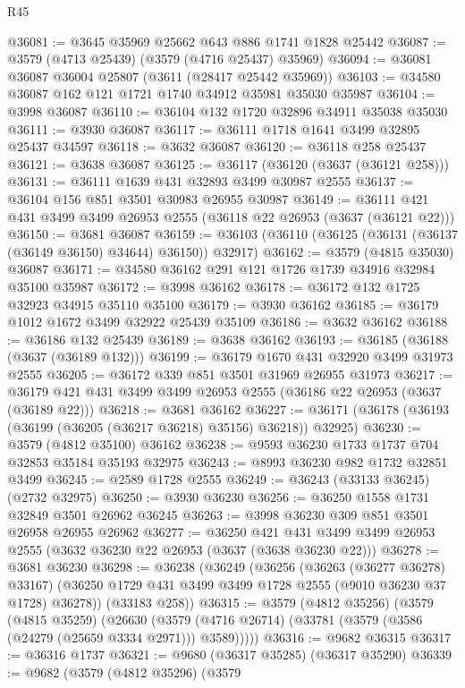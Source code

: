 \begin{lexlean}{R45}
\begin{coremodule}
@36081 := @3645 @35969 @25662 @643 @886 @1741 @1828 @25442
@36087 := @3579 (@4713 @25439) (@3579 (@4716 @25437) @35969)
@36094 := @36081 @36087 @36004 @25807 (@3611 (@28417 @25442 @35969))
@36103 := @34580 @36087 @162 @121 @1721 @1740 @34912 @35981 @35030 @35987
@36104 := @3998 @36087
@36110 := @36104 @132 @1720 @32896 @34911 @35038 @35030
@36111 := @3930 @36087
@36117 := @36111 @1718 @1641 @3499 @32895 @25437 @34597
@36118 := @3632 @36087
@36120 := @36118 @258 @25437
@36121 := @3638 @36087
@36125 := @36117 (@36120 (@3637 (@36121 @258)))
@36131 := @36111 @1639 @431 @32893 @3499 @30987 @2555
@36137 := @36104 @156 @851 @3501 @30983 @26955 @30987
@36149 := @36111 @421 @431 @3499 @3499 @26953 @2555 (@36118 @22 @26953 (@3637 (@36121 @22)))
@36150 := @3681 @36087
@36159 := @36103 (@36110 (@36125 (@36131 (@36137 (@36149 @36150) @34644) @36150)) @32917)
@36162 := @3579 (@4815 @35030) @36087
@36171 := @34580 @36162 @291 @121 @1726 @1739 @34916 @32984 @35100 @35987
@36172 := @3998 @36162
@36178 := @36172 @132 @1725 @32923 @34915 @35110 @35100
@36179 := @3930 @36162
@36185 := @36179 @1012 @1672 @3499 @32922 @25439 @35109
@36186 := @3632 @36162
@36188 := @36186 @132 @25439
@36189 := @3638 @36162
@36193 := @36185 (@36188 (@3637 (@36189 @132)))
@36199 := @36179 @1670 @431 @32920 @3499 @31973 @2555
@36205 := @36172 @339 @851 @3501 @31969 @26955 @31973
@36217 := @36179 @421 @431 @3499 @3499 @26953 @2555 (@36186 @22 @26953 (@3637 (@36189 @22)))
@36218 := @3681 @36162
@36227 := @36171 (@36178 (@36193 (@36199 (@36205 (@36217 @36218) @35156) @36218)) @32925)
@36230 := @3579 (@4812 @35100) @36162
@36238 := @9593 @36230 @1733 @1737 @704 @32853 @35184 @35193 @32975
@36243 := @8993 @36230 @982 @1732 @32851 @3499
@36245 := @2589 @1728 @2555
@36249 := @36243 (@33133 @36245) (@2732 @32975)
@36250 := @3930 @36230
@36256 := @36250 @1558 @1731 @32849 @3501 @26962 @36245
@36263 := @3998 @36230 @309 @851 @3501 @26958 @26955 @26962
@36277 := @36250
    @421
    @431
    @3499
    @3499
    @26953
    @2555
    (@3632 @36230 @22 @26953 (@3637 (@3638 @36230 @22)))
@36278 := @3681 @36230
@36298 := @36238
    (@36249
      (@36256
        (@36263 (@36277 @36278) @33167)
        (@36250 @1729 @431 @3499 @3499 @1728 @2555 (@9010 @36230 @37 @1728) @36278))
      (@33183 @258))
@36315 := @3579
    (@4812 @35256)
    (@3579
      (@4815 @35259)
      (@26630 (@3579 (@4716 @26714) (@33781 (@3579 (@3586 (@24279 (@25659 @3334 @2971))) @3589)))))
@36316 := @9682 @36315
@36317 := @36316 @1737
@36321 := @9680 (@36317 @35285) (@36317 @35290)
@36339 := @9682
    (@3579
      (@4812 @35296)
      (@3579

\end{coremodule}
\end{lexlean}
